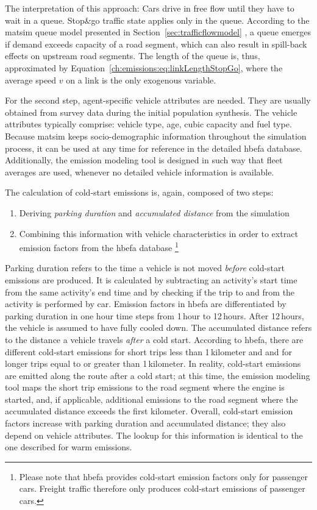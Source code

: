 %
The interpretation of this approach:
%
Cars drive in free flow until they have to wait in a queue.  Stop\&go traffic state applies only in the queue. According to the \gls{matsim} queue model presented in Section~\ref{sec:trafficflowmodel}
%
%
, a queue emerges if demand exceeds capacity of a road segment, which can also result in spill-back effects on upstream road segments. The length of the queue is, thus, approximated by Equation~\ref{ch:emissions:eq:linkLengthStopGo}, where the average speed $v$ on a link is the only exogenous variable.

For the second step, agent-specific vehicle attributes are needed. They are 
usually obtained from survey data during the initial population 
synthesis. The vehicle attributes typically comprise: vehicle type, age, cubic 
capacity and fuel type. Because \gls{matsim} keeps socio-demographic information throughout 
the simulation process, it can be used at any time for reference in the 
detailed \gls{hbefa} database. Additionally, the emission modeling tool 
is designed in such way that fleet averages are used, whenever no detailed 
vehicle information is available.

The calculation of cold-start emissions is, again, composed of two steps:
%
\begin{enumerate}
 \item Deriving \emph{parking duration} and \emph{accumulated distance} 
 from the simulation
 \item Combining this information with vehicle characteristics in order to 
 extract emission factors from the \gls{hbefa} database%
 \footnote{
 Please note that \gls{hbefa} provides cold-start emission factors only for 
 passenger cars. Freight traffic therefore only produces cold-start emissions 
 of passenger cars.
 }
\end{enumerate}
%
Parking duration refers to the time a vehicle is not moved \emph{before} 
cold-start emissions are produced. It is calculated by subtracting an 
activity's start time from the same activity's end time and by checking if the 
trip to and from the activity is performed by car. Emission factors in 
\gls{hbefa} 
are differentiated by parking duration in one hour time steps from 1\,hour to 
12\,hours. After 12\,hours, the vehicle is assumed to have fully cooled down.
%
The accumulated distance refers to the distance a vehicle travels \emph{after} 
a cold start. According to \gls{hbefa}, there are different cold-start 
emissions for short trips less than 1\,kilometer and and for longer trips equal to or greater than  1\,kilometer.
%
In reality, cold-start emissions are emitted along the route after a cold start;
at this time, the emission modeling tool maps the short trip emissions to the road
segment where the engine is started, and, if applicable, additional emissions
to the road segment where the accumulated distance exceeds the first kilometer.
%
Overall, cold-start emission factors increase with parking duration and 
accumulated distance; they also depend on vehicle attributes. The 
lookup for this information is identical to the one described for warm 
emissions.

